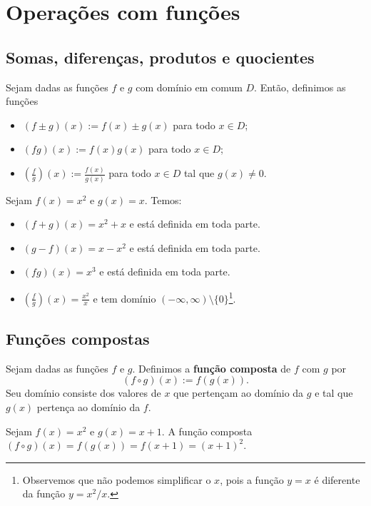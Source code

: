 \section{Operações com funções}\label{cap_funcao_sec_opfun}

\subsection{Somas, diferenças, produtos e quocientes}

Sejam dadas as funções $f$ e $g$ com domínio em comum $D$. Então, definimos as funções
\begin{itemize}
\item $(f\pm g)(x) := f(x) \pm g(x)$ para todo $x\in D$;
\item $(fg)(x) := f(x)g(x)$ para todo $x\in D$;
\item $\displaystyle \left(\frac{f}{g}\right)(x) := \frac{f(x)}{g(x)}$ para todo $x\in D$ tal que $g(x)\neq 0$.
\end{itemize}

\begin{ex}
  Sejam $f(x)=x^2$ e $g(x)=x$. Temos:
  \begin{itemize}
  \item $(f+g)(x) = x^2 + x$ e está definida em toda parte.
  \item $(g-f)(x) = x - x^2$ e está definida em toda parte.
  \item $(fg)(x) = x^3$ e está definida em toda parte.
  \item $\left(\frac{f}{g}\right)(x) = \frac{x^2}{x}$ e tem domínio $(-\infty, \infty)\setminus \{0\}$\footnote{Observemos que não podemos simplificar o $x$, pois a função $y=x$ é diferente da função $y=x^2/x$.}.
  \end{itemize}
\end{ex}

\subsection{Funções compostas}

Sejam dadas as funções $f$ e $g$. Definimos a {\bf função composta} de $f$ com $g$ por
\begin{equation}
  (f\circ g)(x) := f(g(x)).
\end{equation}
Seu domínio consiste dos valores de $x$ que pertençam ao domínio da $g$ e tal que $g(x)$ pertença ao domínio da $f$.

\begin{ex}
  Sejam $f(x) = x^2$ e $g(x) = x+1$. A função composta $(f\circ g)(x) = f(g(x)) = f(x+1) = (x+1)^2$.
\end{ex}

